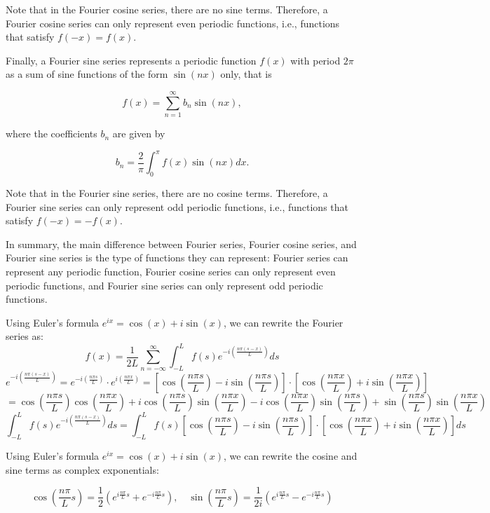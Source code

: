 \documentclass[12pt]{article} %
\begin{document}
Note that in the Fourier cosine series, there are no sine terms. Therefore, a Fourier cosine series can only represent even periodic functions, i.e., functions that satisfy $f(-x) = f(x)$.

Finally, a Fourier sine series represents a periodic function $f(x)$ with period $2\pi$ as a sum of sine functions of the form $\sin(nx)$ only, that is

$$f(x) = \sum_{n=1}^\infty b_n \sin(nx),$$

where the coefficients $b_n$ are given by

$$b_n = \frac{2}{\pi} \int_{0}^{\pi} f(x) \sin(nx) dx.$$

Note that in the Fourier sine series, there are no cosine terms. Therefore, a Fourier sine series can only represent odd periodic functions, i.e., functions that satisfy $f(-x) = -f(x)$.

In summary, the main difference between Fourier series, Fourier cosine series, and Fourier sine series is the type of functions they can represent: Fourier series can represent any periodic function, Fourier cosine series can only represent even periodic functions, and Fourier sine series can only represent odd periodic functions.\par
Using Euler's formula $e^{ix} = \cos(x) + i\sin(x)$, we can rewrite the Fourier series as:
\begin{equation}
f(x) = \frac{1}{2L} \sum_{n= -\infty}^{\infty} \int_{-L}^{L} f(s)e^{-i(\frac{n\pi (s-x)}{L})}ds
\end{equation}
$$
e^{-i(\frac{n\pi (s-x)}{L})}=e^{-i(\frac{n\pi s}{L})}\cdot e^{i(\frac{n\pi x}{L})}=
 [\cos(\frac{n\pi s}{L}) - i\sin(\frac{n\pi s}{L})]\cdot [\cos(\frac{n\pi x}{L}) + i\sin(\frac{n\pi x}{L})]
$$
$$
=\cos(\frac{n\pi s}{L})\cos(\frac{n\pi x}{L})+i \cos(\frac{n\pi s}{L}) \sin(\frac{n\pi x}{L}) - i\cos(\frac{n\pi x}{L})\sin(\frac{n\pi s}{L})+\sin(\frac{n\pi s}{L})\sin(\frac{n\pi x}{L})
$$
$$
\int_{-L}^{L} f(s)e^{-i(\frac{n\pi (s-x)}{L})}ds=\int_{-L}^{L} f(s) [\cos(\frac{n\pi s}{L}) - i\sin(\frac{n\pi s}{L})]\cdot [\cos(\frac{n\pi x}{L}) + i\sin(\frac{n\pi x}{L})] ds
$$\par
Using Euler's formula $e^{ix} = \cos(x) + i\sin(x)$, we can rewrite the cosine and sine terms as complex exponentials:

$$\cos\left(\frac{n\pi}{L}s\right) = \frac{1}{2}\left(e^{i\frac{n\pi}{L}s} + e^{-i\frac{n\pi}{L}s}\right),\quad \sin\left(\frac{n\pi}{L}s\right) = \frac{1}{2i}\left(e^{i\frac{n\pi}{L}s} - e^{-i\frac{n\pi}{L}s}\right)$$
\end{document}
